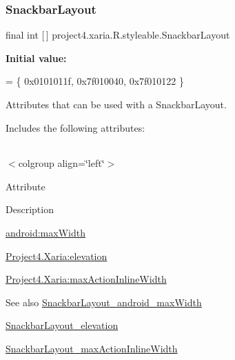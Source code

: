 \subsubsection{\texorpdfstring{Snackbar\+Layout}{SnackbarLayout}}
{\footnotesize\ttfamily final int \mbox{[}$\,$\mbox{]} project4.\+xaria.\+R.\+styleable.\+Snackbar\+Layout\hspace{0.3cm}{\ttfamily [static]}}

{\bfseries Initial value\+:}
\begin{DoxyCode}
= \{
            0x0101011f, 0x7f010040, 0x7f010122
        \}
\end{DoxyCode}
Attributes that can be used with a Snackbar\+Layout. 

Includes the following attributes\+:

\tabulinesep=1mm
\begin{longtabu} spread 0pt [c]{*{0}{|X[-1]}|}
\hline
\end{longtabu}
$<$colgroup align=\char`\"{}left\char`\"{}$>$ 

Attribute

Description 

{\ttfamily \hyperlink{classproject4_1_1xaria_1_1R_1_1styleable_ab9a235e718272e8d3ea3f5f5d86f818a}{android\+:max\+Width}}

{\ttfamily \hyperlink{classproject4_1_1xaria_1_1R_1_1styleable_ab22b388ecf19f24c4ad1e2f82bedc866}{Project4.\+Xaria\+:elevation}}

{\ttfamily \hyperlink{classproject4_1_1xaria_1_1R_1_1styleable_a48e0fac8abd650e6887e336aa35757a8}{Project4.\+Xaria\+:max\+Action\+Inline\+Width}}

\begin{DoxySeeAlso}{See also}
\hyperlink{classproject4_1_1xaria_1_1R_1_1styleable_ab9a235e718272e8d3ea3f5f5d86f818a}{Snackbar\+Layout\+\_\+android\+\_\+max\+Width} 

\hyperlink{classproject4_1_1xaria_1_1R_1_1styleable_ab22b388ecf19f24c4ad1e2f82bedc866}{Snackbar\+Layout\+\_\+elevation} 

\hyperlink{classproject4_1_1xaria_1_1R_1_1styleable_a48e0fac8abd650e6887e336aa35757a8}{Snackbar\+Layout\+\_\+max\+Action\+Inline\+Width} 
\end{DoxySeeAlso}
\mbox{\label{classproject4_1_1xaria_1_1R_1_1styleable_ab9a235e718272e8d3ea3f5f5d86f818a}} 
